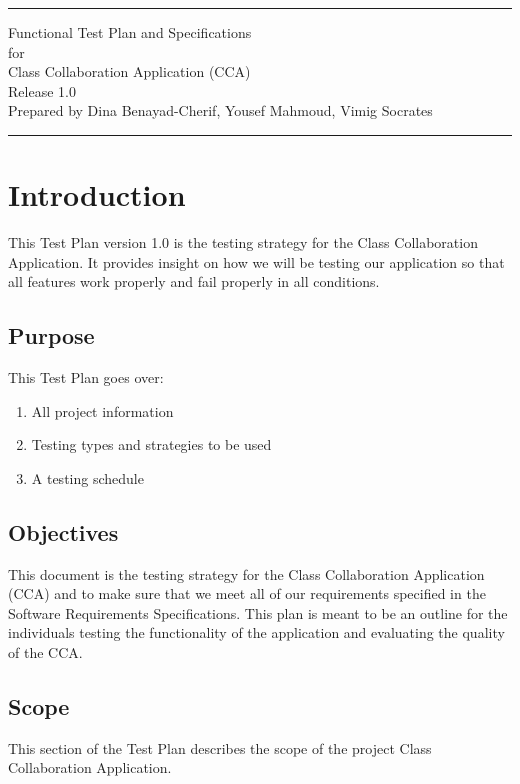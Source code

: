 \documentclass{scrreprt}
\date{}
\def\myversion{1.0}
\begin{document}
\begin{flushright}
	\rule{16cm}{5pt}\vskip1cm
	\Huge{Functional Test Plan and Specifications}\\
	\vspace{2cm}
	for\\
	\vspace{2cm}
	Class Collaboration Application (CCA)\\
	\vspace{2cm}
	\LARGE{Release \myversion \\}
	\vspace{2cm}
	Prepared by Dina Benayad-Cherif, Yousef Mahmoud, Vimig Socrates\\
	\vfill
	\rule{16cm}{5pt}
\end{flushright}

\tableofcontents



\chapter{Introduction}
This Test Plan version 1.0 is the testing strategy for the Class Collaboration Application. It provides insight on how we will be testing our application so that all features work properly and fail properly in all conditions. 

\section{Purpose}
This Test Plan goes over:
\begin{enumerate}
\item All project information
\item Testing types and strategies to be used
\item A testing schedule
\end{enumerate}

\section{Objectives}
This document is the testing strategy for the Class Collaboration Application (CCA) and to make sure that we meet all of our requirements specified in the Software Requirements Specifications. This plan is meant to be an outline for the individuals testing the functionality of the application and evaluating the quality of the CCA. 

\section{Scope}
This section of the Test Plan describes the scope of the project Class Collaboration Application. 
\end{document}
